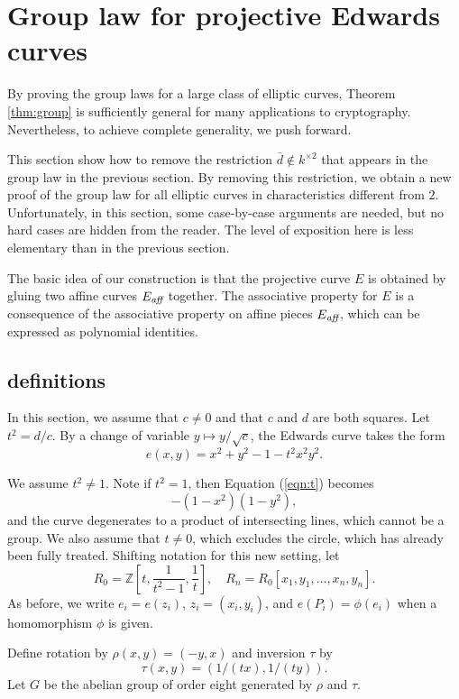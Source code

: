 \documentclass[12pt]{article}
\newcommand{\ring}[1]{\mathbb{#1}}
\newcommand{\op}[1]{\hbox{#1}}
\newcommand{\Eaff}{E_{\op{\scriptsize\it aff}}}
\begin{document}
\section{Group law for projective Edwards curves}

By proving the group laws for a large class of elliptic curves,
Theorem \ref{thm:group} is sufficiently general for many applications
to cryptography.  Nevertheless, to achieve complete generality, we
push forward.

This section show how to remove the restriction $\bar d\not\in
k^{\times 2}$ that appears in the group law in the previous section.
By removing this restriction, we obtain a new proof of the group law
for all elliptic curves in characteristics different from $2$.
Unfortunately, in this section, some case-by-case arguments are
needed, but no hard cases are hidden from the reader.  The level of
exposition here is less elementary than in the previous section.

The basic idea of our construction is that the projective
curve $E$ is obtained by gluing two affine curves $\Eaff$
together.  The associative property for $E$ is a consequence
of the associative property on affine pieces $\Eaff$, which
can be expressed as polynomial identities.



\subsection{definitions}

In this section, we assume that $c\ne 0$ and that $c$ and $d$ are both
squares.  Let $t^2 = d/c$.  By a change of variable $y\mapsto
y/\sqrt{c}$, the Edwards curve takes the form
\begin{equation}\label{eqn:t}
e(x,y)= x^2 + y^2 -1 - t^2 x^2 y^2.
\end{equation}

We assume $t^2\ne 1$.  Note if $t^2=1$, then Equation (\ref{eqn:t})
becomes
\[
-(1-x^2)(1-y^2),
\]
and the curve degenerates to a product of intersecting lines, which
cannot be a group.  We also assume that $t\ne 0$, which excludes the
circle, which has already been fully treated.  Shifting notation for
this new setting, let
\[
R_0 = \ring{Z}[t,\frac{1}{t^2-1},\frac1t],\quad
R_n = R_0[x_1,y_1,\ldots,x_n,y_n].
\]
As before, we write $e_i = e(z_i)$, $z_i=(x_i,y_i)$, and $ e(P_i) =
\phi(e_i)$ when a homomorphism $\phi$ is given.

Define rotation by $\rho(x,y)=(-y,x)$ and inversion $\tau$ by
\[
\tau(x,y) = (1/(tx),1/(ty)).
\]
Let $G$ be the abelian group of order eight generated by $\rho$ and
$\tau$.
\end{document}
